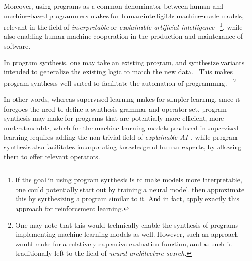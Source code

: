 \documentclass{article}
\begin{document}
Moreover, using programs as a common denominator between human and machine-based programmers makes for human-intelligible machine-made models,
relevant in the field of \emph{interpretable} or \emph{explainable artificial intelligence}
~\footnote{
    If the goal in using program synthesis is to make models more interpretable,
    one could potentially start out by training a neural model,
    then approximate this by synthesizing a program similar to it.
    And in fact, \citet{pirl} apply exactly this approach for reinforcement learning.
},
while also enabling human-machine cooperation in the production and maintenance of software.


In program synthesis, one may take an existing program, and synthesize variants intended to generalize the existing logic to match the new data.~\citep{myth}
This makes program synthesis well-suited to facilitate the automation of programming.%
~\footnote{
    One may note that this would technically enable the synthesis of programs implementing machine learning models as well.
    However, such an approach would make for a relatively expensive evaluation function,
    and as such is traditionally left to the field of \emph{neural architecture search}.
}

In other words, whereas supervised learning makes for simpler learning,
since it foregoes the need to define a synthesis grammar and operator set,
program synthesis may make for programs that are potentially more efficient,
more understandable,
which for the machine learning models produced in supervised learning requires adding the non-trivial field of \emph{explainable AI}~\citep{gunning2017explainable},
while program synthesis also facilitates incorporating knowledge of human experts,
by allowing them to offer relevant operators.
\end{document}
